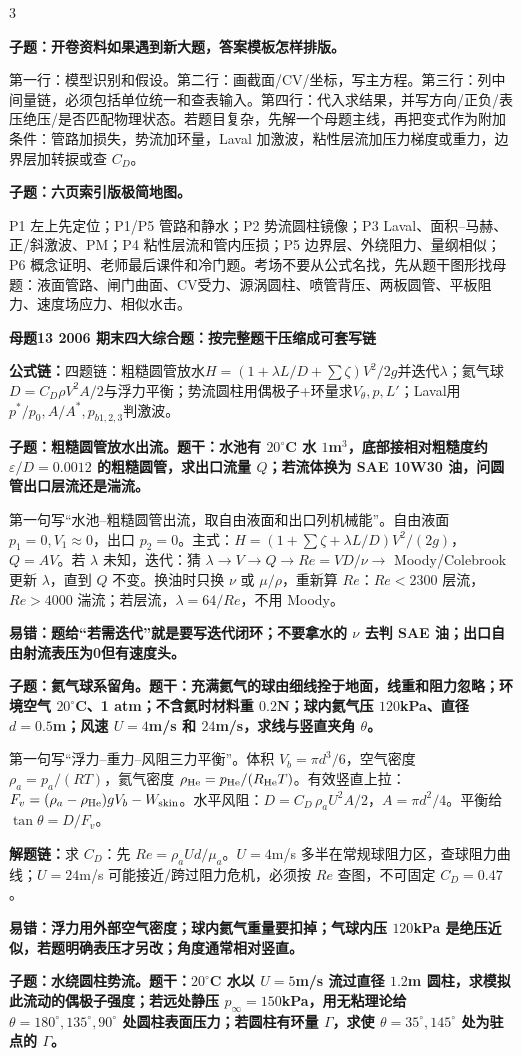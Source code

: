 \documentclass[a4paper]{article}
\newcommand{\mt}[1]{\vspace{0.12pt}\colorbox{M}{\parbox{\dimexpr\linewidth-2\fboxsep}{\color{white}\bfseries #1}}\par}
\newcommand{\qt}[1]{\vspace{0.04pt}\colorbox{Q}{\parbox{\dimexpr\linewidth-2\fboxsep}{\color{white}\bfseries #1}}\par}
\newcommand{\ans}[1]{\colorbox{G}{\parbox{\dimexpr\linewidth-2\fboxsep}{#1}}\par}
\newcommand{\warn}[1]{\colorbox{Y}{\parbox{\dimexpr\linewidth-2\fboxsep}{\color{E}\bfseries #1}}\par}
\newcommand{\chain}[1]{{\color{A}\bfseries 解题链：}#1\par}
\newcommand{\form}[1]{{\color{M}\bfseries 公式链：}#1\par}
\begin{document}
\begin{multicols}{3}
\qt{子题：开卷资料如果遇到新大题，答案模板怎样排版。}
\ans{第一行：模型识别和假设。第二行：画截面/CV/坐标，写主方程。第三行：列中间量链，必须包括单位统一和查表输入。第四行：代入求结果，并写方向/正负/表压绝压/是否匹配物理状态。若题目复杂，先解一个母题主线，再把变式作为附加条件：管路加损失，势流加环量，Laval 加激波，粘性层流加压力梯度或重力，边界层加转捩或查 $C_D$。}
\qt{子题：六页索引版极简地图。}
\ans{P1 左上先定位；P1/P5 管路和静水；P2 势流圆柱镜像；P3 Laval、面积--马赫、正/斜激波、PM；P4 粘性层流和管内压损；P5 边界层、外绕阻力、量纲相似；P6 概念证明、老师最后课件和冷门题。考场不要从公式名找，先从题干图形找母题：液面管路、闸门曲面、CV受力、源涡圆柱、喷管背压、两板圆管、平板阻力、速度场应力、相似水击。}

\mt{母题13 2006 期末四大综合题：按完整题干压缩成可套写链}
\form{四题链：粗糙圆管放水$H=(1+\lambda L/D+\sum\zeta)V^2/2g$并迭代$\lambda$；氦气球$D=C_D\rho V^2A/2$与浮力平衡；势流圆柱用偶极子+环量求$V_\theta,p,L'$；Laval用$p^*/p_0,A/A^*,p_{b1,2,3}$判激波。}
\qt{子题：粗糙圆管放水出流。题干：水池有 $20^\circ$C 水 $1$m$^3$，底部接相对粗糙度约 $\varepsilon/D=0.0012$ 的粗糙圆管，求出口流量 $Q$；若流体换为 SAE 10W30 油，问圆管出口层流还是湍流。}
\ans{第一句写“水池--粗糙圆管出流，取自由液面和出口列机械能”。自由液面 $p_1=0,V_1\approx0$，出口 $p_2=0$。主式：$H=(1+\sum\zeta+\lambda L/D)V^2/(2g)$，$Q=AV$。若 $\lambda$ 未知，迭代：猜 $\lambda\to V\to Q\to Re=VD/\nu\to$ Moody/Colebrook 更新 $\lambda$，直到 $Q$ 不变。换油时只换 $\nu$ 或 $\mu/\rho$，重新算 $Re$：$Re<2300$ 层流，$Re>4000$ 湍流；若层流，$\lambda=64/Re$，不用 Moody。}
\warn{易错：题给“若需迭代”就是要写迭代闭环；不要拿水的 $\nu$ 去判 SAE 油；出口自由射流表压为0但有速度头。}
\qt{子题：氦气球系留角。题干：充满氦气的球由细线拴于地面，线重和阻力忽略；环境空气 $20^\circ$C、1 atm；不含氦时材料重 $0.2$N；球内氦气压 $120$kPa、直径 $d=0.5$m；风速 $U=4$m/s 和 $24$m/s，求线与竖直夹角 $\theta$。}
\ans{第一句写“浮力--重力--风阻三力平衡”。体积 $V_b=\pi d^3/6$，空气密度 $\rho_a=p_a/(RT)$，氦气密度 $\rho_{\rm He}=p_{\rm He}/(R_{\rm He}T)$。有效竖直上拉：$F_v=(\rho_a-\rho_{\rm He})gV_b-W_{\rm skin}$。水平风阻：$D=C_D\,\rho_aU^2A/2$，$A=\pi d^2/4$。平衡给 $\tan\theta=D/F_v$。}
\chain{求 $C_D$：先 $Re=\rho_aUd/\mu_a$。$U=4$m/s 多半在常规球阻力区，查球阻力曲线；$U=24$m/s 可能接近/跨过阻力危机，必须按 $Re$ 查图，不可固定 $C_D=0.47$。}
\warn{易错：浮力用外部空气密度；球内氦气重量要扣掉；气球内压 $120$kPa 是绝压近似，若题明确表压才另改；角度通常相对竖直。}
\qt{子题：水绕圆柱势流。题干：$20^\circ$C 水以 $U=5$m/s 流过直径 $1.2$m 圆柱，求模拟此流动的偶极子强度；若远处静压 $p_\infty=150$kPa，用无粘理论给 $\theta=180^\circ,135^\circ,90^\circ$ 处圆柱表面压力；若圆柱有环量 $\Gamma$，求使 $\theta=35^\circ,145^\circ$ 处为驻点的 $\Gamma$。}

\end{multicols}
\end{document}
